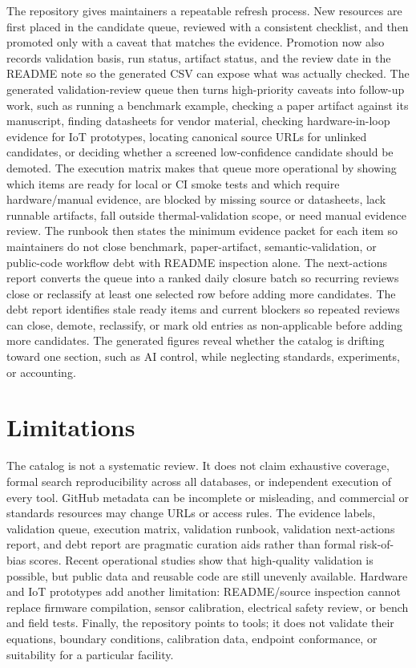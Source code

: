 \documentclass[11pt]{article}
\begin{document}
The repository gives maintainers a repeatable refresh process. New resources are first placed in the candidate queue, reviewed with a consistent checklist, and then promoted only with a caveat that matches the evidence. Promotion now also records validation basis, run status, artifact status, and the review date in the README note so the generated CSV can expose what was actually checked. The generated validation-review queue then turns high-priority caveats into follow-up work, such as running a benchmark example, checking a paper artifact against its manuscript, finding datasheets for vendor material, checking hardware-in-loop evidence for IoT prototypes, locating canonical source URLs for unlinked candidates, or deciding whether a screened low-confidence candidate should be demoted. The execution matrix makes that queue more operational by showing which items are ready for local or CI smoke tests and which require hardware/manual evidence, are blocked by missing source or datasheets, lack runnable artifacts, fall outside thermal-validation scope, or need manual evidence review. The runbook then states the minimum evidence packet for each item so maintainers do not close benchmark, paper-artifact, semantic-validation, or public-code workflow debt with README inspection alone. The next-actions report converts the queue into a ranked daily closure batch so recurring reviews close or reclassify at least one selected row before adding more candidates. The debt report identifies stale ready items and current blockers so repeated reviews can close, demote, reclassify, or mark old entries as non-applicable before adding more candidates. The generated figures reveal whether the catalog is drifting toward one section, such as AI control, while neglecting standards, experiments, or accounting.

\section{Limitations}

The catalog is not a systematic review. It does not claim exhaustive coverage, formal search reproducibility across all databases, or independent execution of every tool. GitHub metadata can be incomplete or misleading, and commercial or standards resources may change URLs or access rules. The evidence labels, validation queue, execution matrix, validation runbook, validation next-actions report, and debt report are pragmatic curation aids rather than formal risk-of-bias scores. Recent operational studies show that high-quality validation is possible, but public data and reusable code are still unevenly available. Hardware and IoT prototypes add another limitation: README/source inspection cannot replace firmware compilation, sensor calibration, electrical safety review, or bench and field tests. Finally, the repository points to tools; it does not validate their equations, boundary conditions, calibration data, endpoint conformance, or suitability for a particular facility.
\end{document}
